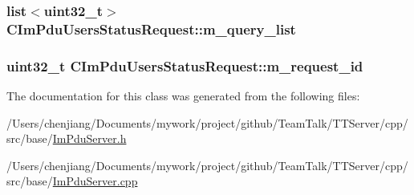 \subsubsection[{m\+\_\+query\+\_\+list}]{\setlength{\rightskip}{0pt plus 5cm}list$<$uint32\+\_\+t$>$ C\+Im\+Pdu\+Users\+Status\+Request\+::m\+\_\+query\+\_\+list\hspace{0.3cm}{\ttfamily [private]}}\label{class_c_im_pdu_users_status_request_ade2158ec3793522ed0782cd0b5780f49}
\hypertarget{class_c_im_pdu_users_status_request_ab52948bacb2733cc575b9962ae58da24}{}
\subsubsection[{m\+\_\+request\+\_\+id}]{\setlength{\rightskip}{0pt plus 5cm}uint32\+\_\+t C\+Im\+Pdu\+Users\+Status\+Request\+::m\+\_\+request\+\_\+id\hspace{0.3cm}{\ttfamily [private]}}\label{class_c_im_pdu_users_status_request_ab52948bacb2733cc575b9962ae58da24}


The documentation for this class was generated from the following files\+:\begin{DoxyCompactItemize}
\item 
/\+Users/chenjiang/\+Documents/mywork/project/github/\+Team\+Talk/\+T\+T\+Server/cpp/src/base/\hyperlink{_im_pdu_server_8h}{Im\+Pdu\+Server.\+h}\item 
/\+Users/chenjiang/\+Documents/mywork/project/github/\+Team\+Talk/\+T\+T\+Server/cpp/src/base/\hyperlink{_im_pdu_server_8cpp}{Im\+Pdu\+Server.\+cpp}\end{DoxyCompactItemize}

